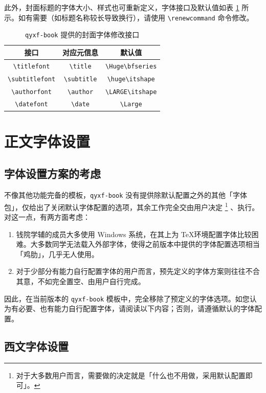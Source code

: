 \documentclass[
  10pt,
  twoside,
  openany,
  b5paper, %
  colorscheme = basic %
]{qyxf-book}
\renewcommand{\titlefont}{\Huge\bfseries}
\renewcommand{\subtitlefont}{\LARGE\itshape}
\begin{document}
此外，封面标题的字体大小、样式也可重新定义，字体接口及默认值如表 \ref{tab:preface-font} 所示。如有需要（如标题名称较长导致换行），请使用 \verb|\renewcommand| 命令修改。

\begin{table}[htbp]
  \centering
  \caption{\texttt{qyxf-book} 提供的封面字体修改接口}
  \label{tab:preface-font}
  \begin{tabular}{ccc}
    \toprule
    接口                    & 对应元信息              & 默认值                  \\
    \midrule
    \verb|\titlefont| & \verb|\title| & \verb|\Huge\bfseries| \\
    \verb|\subtitlefont| & \verb|\subtitle| & \verb|\huge\itshape| \\
    \verb|\authorfont| & \verb|\author| & \verb|\LARGE\itshape| \\
    \verb|\datefont| & \verb|\date| & \verb|\Large| \\
    \bottomrule
  \end{tabular}
\end{table}

\section{正文字体设置}

\subsection{字体设置方案的考虑}

不像其他功能完备的模板，\verb|qyxf-book| 没有提供除默认配置之外的其他「字体包」，仅给出了关闭默认字体配置的选项，其余工作完全交由用户决定
\footnote{对于大多数用户而言，需要做的决定就是「什么也不用做，采用默认配置即可」。}
、执行。对这一点，有两方面考虑：
\begin{enumerate}
  \item 钱院学辅的成员大多使用 Windows 系统，在其上为 \TeX 环境配置字体比较困难。大多数同学无法载入外部字体，使得之前版本中提供的字体配置选项相当「鸡肋」，几乎无人使用。
  \item 对于少部分有能力自行配置字体的用户而言，预先定义的字体方案则往往不合其意，不如完全置空、由用户自行完成。
\end{enumerate}
因此，在当前版本的 \verb|qyxf-book| 模板中，完全移除了预定义的字体选项。如您认为有必要、也有能力自行配置字体，请阅读以下内容；否则，请遵循默认的字体配置。

\subsection{西文字体设置}
\end{document}
